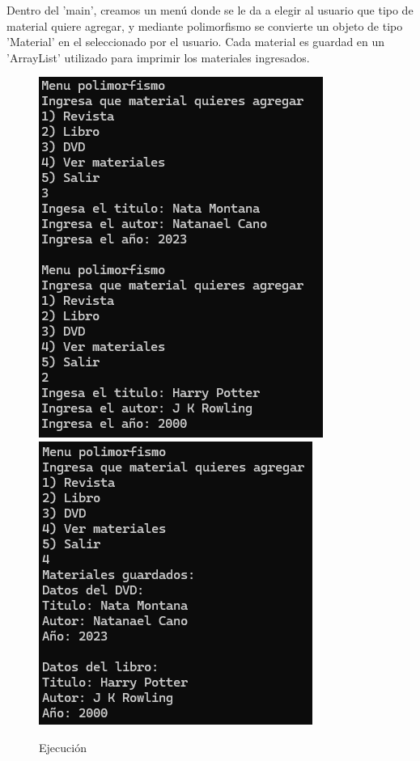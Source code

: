 \documentclass[letterpaper,12pt]{article}
\begin{document}
Dentro del 'main', creamos un menú donde se le da a elegir al usuario que tipo de material quiere agregar, y mediante polimorfismo se convierte un objeto de tipo 'Material' en el seleccionado por el usuario. Cada material es guardad en un 'ArrayList' utilizado para imprimir los materiales ingresados.

\begin{figure}[H]
    \centering
    \includegraphics[width=0.45\linewidth]{Imagenes/a.png}
    \includegraphics[width=0.45\linewidth]{Imagenes/s.png}
    \caption*{Ejecución}
\end{figure}
\end{document}
